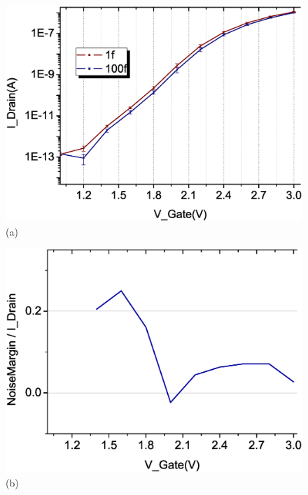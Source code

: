 \begin{figure}[h!]
    \centering
    \begin{minipage}[t][20cm][t]{1\textwidth}
        \begin{minipage}[t]{0.5\textwidth}
            \centering
            \includegraphics[scale=0.3]{images/chapter3/208_devices/L2-7_log.eps}
            (a)
        \end{minipage}
        \hfill
        \begin{minipage}[t]{0.5\textwidth}
            \raggedleft
            \includegraphics[scale=0.3]{images/chapter3/208_devices/L2-7_margin.eps}
            \centering
            (b)
        \end{minipage}
        \vfill
        \begin{minipage}[t]{0.5\textwidth}

\end{minipage}
\end{minipage}
\end{figure}
